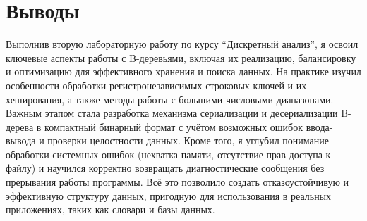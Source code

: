 \section{Выводы}
Выполнив вторую лабораторную работу по курсу \enquote{Дискретный анализ}, я освоил ключевые аспекты работы с B-деревьями, включая их реализацию, балансировку и оптимизацию для эффективного хранения и поиска данных. На практике изучил особенности обработки регистронезависимых строковых ключей и их хеширования, а также методы работы с большими числовыми диапазонами. Важным этапом стала разработка механизма сериализации и десериализации B-дерева в компактный бинарный формат с учётом возможных ошибок ввода-вывода и проверки целостности данных. Кроме того, я углубил понимание обработки системных ошибок (нехватка памяти, отсутствие прав доступа к файлу) и научился корректно возвращать диагностические сообщения без прерывания работы программы. Всё это позволило создать отказоустойчивую и эффективную структуру данных, пригодную для использования в реальных приложениях, таких как словари и базы данных.
\pagebreak
